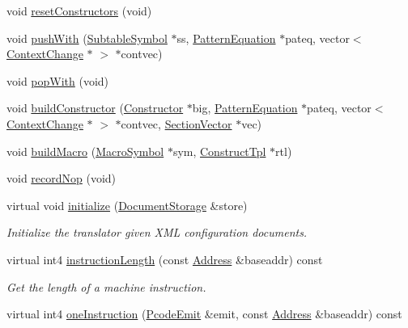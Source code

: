 \begin{DoxyCompactItemize}
\item 
void \mbox{\hyperlink{class_sleigh_compile_a95789f902da8678b1ef5fa019b1733ec}{reset\+Constructors}} (void)
\item 
void \mbox{\hyperlink{class_sleigh_compile_a2f5d83b885d823b22f3591795f8e3457}{push\+With}} (\mbox{\hyperlink{class_subtable_symbol}{Subtable\+Symbol}} $\ast$ss, \mbox{\hyperlink{class_pattern_equation}{Pattern\+Equation}} $\ast$pateq, vector$<$ \mbox{\hyperlink{class_context_change}{Context\+Change}} $\ast$ $>$ $\ast$contvec)
\item 
void \mbox{\hyperlink{class_sleigh_compile_a6debbf54d93edca9385ae391968bec76}{pop\+With}} (void)
\item 
void \mbox{\hyperlink{class_sleigh_compile_a2d11b92b6c5db7386b319ad88202c2b2}{build\+Constructor}} (\mbox{\hyperlink{class_constructor}{Constructor}} $\ast$big, \mbox{\hyperlink{class_pattern_equation}{Pattern\+Equation}} $\ast$pateq, vector$<$ \mbox{\hyperlink{class_context_change}{Context\+Change}} $\ast$ $>$ $\ast$contvec, \mbox{\hyperlink{class_section_vector}{Section\+Vector}} $\ast$vec)
\item 
void \mbox{\hyperlink{class_sleigh_compile_af1254837779064d42c7d575f30b66b68}{build\+Macro}} (\mbox{\hyperlink{class_macro_symbol}{Macro\+Symbol}} $\ast$sym, \mbox{\hyperlink{class_construct_tpl}{Construct\+Tpl}} $\ast$rtl)
\item 
void \mbox{\hyperlink{class_sleigh_compile_ab611793098a7d9c4cd867862e9d01701}{record\+Nop}} (void)
\item 
virtual void \mbox{\hyperlink{class_sleigh_compile_afbc2737c7b6421eba8b0cca13039270c}{initialize}} (\mbox{\hyperlink{class_document_storage}{Document\+Storage}} \&store)
\begin{DoxyCompactList}\small\item\em Initialize the translator given X\+ML configuration documents. \end{DoxyCompactList}\item 
virtual int4 \mbox{\hyperlink{class_sleigh_compile_acec92daa9826ded3fe156d2b58ccc2ca}{instruction\+Length}} (const \mbox{\hyperlink{class_address}{Address}} \&baseaddr) const
\begin{DoxyCompactList}\small\item\em Get the length of a machine instruction. \end{DoxyCompactList}\item 
virtual int4 \mbox{\hyperlink{class_sleigh_compile_acdc475de0a5d086c9d256f28c2f6862d}{one\+Instruction}} (\mbox{\hyperlink{class_pcode_emit}{Pcode\+Emit}} \&emit, const \mbox{\hyperlink{class_address}{Address}} \&baseaddr) const

\end{DoxyCompactItemize}
